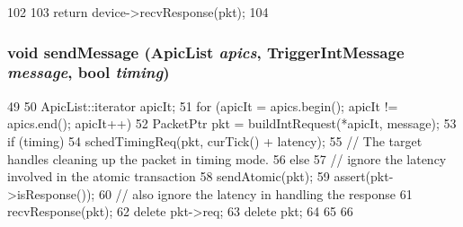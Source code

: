 \begin{DoxyCode}
102         {
103             return device->recvResponse(pkt);
104         }
\end{DoxyCode}
\hypertarget{classX86ISA_1_1IntDevice_1_1IntMasterPort_aa8849259721c2101686b45b59b587253}{
\subsubsection[{sendMessage}]{\setlength{\rightskip}{0pt plus 5cm}void sendMessage ({\bf ApicList} {\em apics}, \/  TriggerIntMessage {\em message}, \/  bool {\em timing})}}
\label{classX86ISA_1_1IntDevice_1_1IntMasterPort_aa8849259721c2101686b45b59b587253}



\begin{DoxyCode}
49 {
50     ApicList::iterator apicIt;
51     for (apicIt = apics.begin(); apicIt != apics.end(); apicIt++) {
52         PacketPtr pkt = buildIntRequest(*apicIt, message);
53         if (timing) {
54             schedTimingReq(pkt, curTick() + latency);
55             // The target handles cleaning up the packet in timing mode.
56         } else {
57             // ignore the latency involved in the atomic transaction
58             sendAtomic(pkt);
59             assert(pkt->isResponse());
60             // also ignore the latency in handling the response
61             recvResponse(pkt);
62             delete pkt->req;
63             delete pkt;
64         }
65     }
66 }
\end{DoxyCode}


